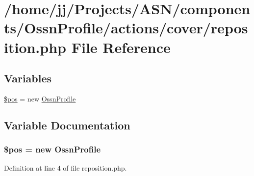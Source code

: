 \hypertarget{_ossn_profile_2actions_2cover_2reposition_8php}{}\section{/home/jj/\+Projects/\+A\+S\+N/components/\+Ossn\+Profile/actions/cover/reposition.php File Reference}
\label{_ossn_profile_2actions_2cover_2reposition_8php}
\subsection*{Variables}
\begin{DoxyCompactItemize}
\item 
\hyperlink{_ossn_profile_2actions_2cover_2reposition_8php_a5de51f0c80b3bb3b39a57b23f6b9ea9f}{\$pos} = new \hyperlink{class_ossn_profile}{Ossn\+Profile}
\end{DoxyCompactItemize}


\subsection{Variable Documentation}
\subsubsection[{\texorpdfstring{\$pos}{$pos}}]{\setlength{\rightskip}{0pt plus 5cm}\$pos = new {\bf Ossn\+Profile}}\hypertarget{_ossn_profile_2actions_2cover_2reposition_8php_a5de51f0c80b3bb3b39a57b23f6b9ea9f}{}\label{_ossn_profile_2actions_2cover_2reposition_8php_a5de51f0c80b3bb3b39a57b23f6b9ea9f}


Definition at line 4 of file reposition.\+php.

